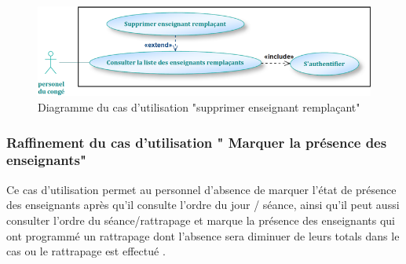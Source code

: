 \documentclass[12 pt ]{report}
\begin{document}
\begin{figure}[h]
 \begin{center}
\includegraphics[width=13 cm ,height= 4 cm]{sup_ens_remp.PNG}
\caption{Diagramme du cas d’utilisation "supprimer enseignant remplaçant"}
\end{center}
\end{figure}
\subsubsection{Raffinement du cas d'utilisation " Marquer la présence des enseignants"}
Ce cas d'utilisation permet au personnel d'absence de marquer l'état 
de présence des enseignants après qu'il consulte l'ordre du jour / séance, ainsi qu'il  peut aussi consulter l'ordre du séance/rattrapage 
et marque la présence des enseignants qui ont programmé un rattrapage dont l'absence  sera diminuer  de leurs totals dans  le cas ou le rattrapage est effectué .\\
\end{document}
